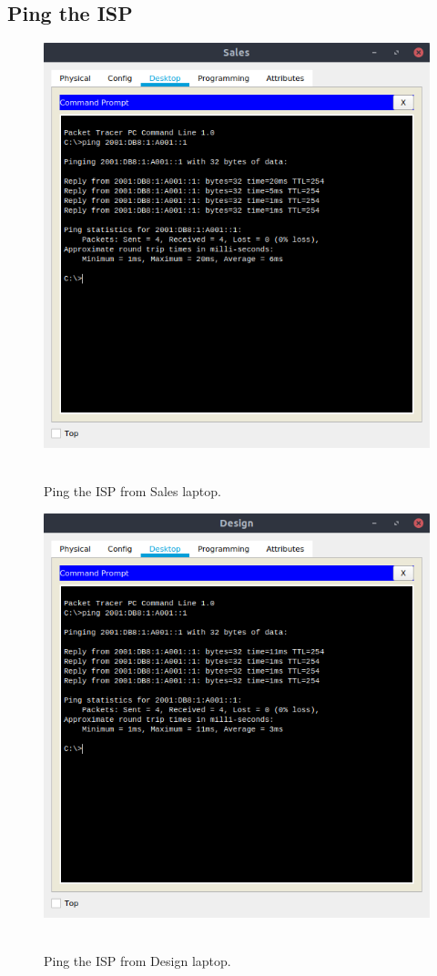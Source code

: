 \documentclass[conference]{IEEEtran}
\begin{document}
\subsection{Ping the ISP}
\begin{center}
\begin{figure}[h]
\includegraphics[scale=0.45]{resources/q422.png}\
\caption{Ping the ISP from Sales laptop.}
\end{figure}
\end{center}

\begin{center}
\begin{figure}[h]
\includegraphics[scale=0.45]{resources/q423.png}\
\caption{Ping the ISP from Design	 laptop.}
\end{figure}
\end{center}
\end{document}
